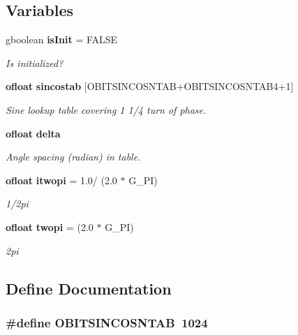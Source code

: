 \subsection*{Variables}
\begin{CompactItemize}
\item 
gboolean {\bf is\-Init} = FALSE
\begin{CompactList}\small\item\em Is initialized? \item\end{CompactList}\item 
{\bf ofloat} {\bf sincostab} [OBITSINCOSNTAB+OBITSINCOSNTAB4+1]
\begin{CompactList}\small\item\em Sine lookup table covering 1 1/4 turn of phase. \item\end{CompactList}\item 
{\bf ofloat} {\bf delta}
\begin{CompactList}\small\item\em Angle spacing (radian) in table. \item\end{CompactList}\item 
{\bf ofloat} {\bf itwopi} = 1.0/ (2.0 $\ast$ G\_\-PI)
\begin{CompactList}\small\item\em 1/2pi \item\end{CompactList}\item 
{\bf ofloat} {\bf twopi} = (2.0 $\ast$ G\_\-PI)
\begin{CompactList}\small\item\em 2pi \item\end{CompactList}\end{CompactItemize}


\subsection{Define Documentation}
\subsubsection{\setlength{\rightskip}{0pt plus 5cm}\#define OBITSINCOSNTAB\ 1024}\label{ObitSinCos_8c_a0}


